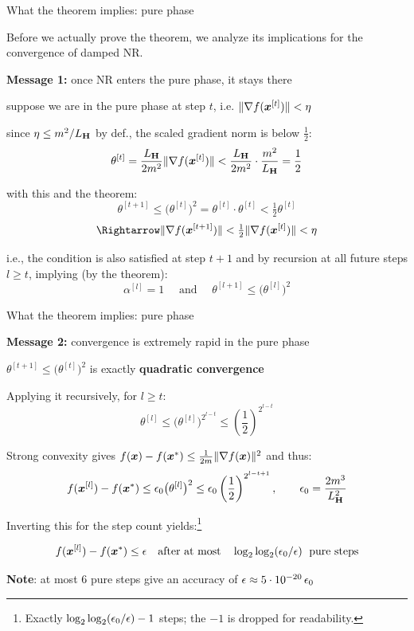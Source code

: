 \documentclass[11pt,compress,t,notes=noshow, xcolor=table]{beamer}
\newcommand{\LH}{L_{\H}}
\begin{document}
\begin{framei}[fs=small]{What the theorem implies: pure phase}
\item [] Before we actually prove the theorem, we analyze its implications for the convergence of damped NR.
\item \textbf{Message 1:} once NR enters the pure phase, it stays there
\begin{itemizeM}
  \item suppose we are in the pure phase at step $t$, i.e. $\|\nabla f(\bm{x}^{[t]})\| < \eta$
  \item since $\eta \le m^2/\LH$ by def., the scaled gradient norm is below $\tfrac{1}{2}$:
  $$\theta^{[t]} = \frac{\LH}{2m^2}\|\nabla f(\xv^{[t]})\|
  < \frac{\LH}{2m^2} \cdot \frac{m^2}{\LH} = \frac{1}{2}$$
  \item with this and the theorem:
  $$\theta^{[t+1]} \le \big( \theta^{[t]} \big)^2 = \theta^{[t]} \cdot \theta^{[t]}
  < \tfrac{1}{2} \theta^{[t]}$$
  $$\Rightarrow \|\nabla f(\xv^{[t+1]})\| < \tfrac{1}{2} \|\nabla f(\xv^{[t]})\| < \eta$$
  \item i.e., the condition is also satisfied at step $t+1$ and by recursion at all future steps $l \geq t$, implying (by the theorem):
  $$\alpha^{[l]} = 1 \quad \text{ and } \quad \theta^{[l+1]} \le \big( \theta^{[l]} \big)^2$$
\end{itemizeM}
\end{framei}

\begin{framei}[fs=small]{What the theorem implies: pure phase}
\item \textbf{Message 2:} convergence is extremely rapid in the pure phase
\begin{itemizeM}
\item $\theta^{[t+1]} \le \big( \theta^{[t]} \big)^2$ is exactly \textbf{quadratic convergence}
\item Applying it recursively, for $l \geq t$:
$$\theta^{[l]} \le \big( \theta^{[t]} \big)^{2^{l-t}} \leq \left(\frac{1}{2}\right)^{2^{l-t}}$$
\item Strong convexity gives $f(\bm{x}) - f(\bm{x}^\ast) \le \frac{1}{2m}\|\nabla f(\bm{x})\|^2$ and thus:
$$f(\xv^{[l]}) - f(\xvs) \le \eps_0 \big( \theta^{[l]} \big)^2
\le \eps_0 \left(\frac{1}{2}\right)^{2^{l-t+1}}, \qquad \eps_0 = \frac{2m^3}{\LH^2}$$
\item Inverting this for the step count yields:\footnote{\footnotesize Exactly
$\log_2 \log_2 (\epsilon_0/\epsilon) - 1$ steps; the $-1$ is dropped for readability.}
\begin{framed}
$$f(\bm{x}^{[l]}) - f(\bm{x}^\ast) \le \epsilon \quad \text{after at most} \quad \log_2 \log_2 (\epsilon_0/\epsilon)
\; \text{ pure steps}$$
\end{framed}
\item[$\Rightarrow$] \textbf{Note}: at most 6 pure steps give an accuracy of
$\epsilon \approx 5 \cdot 10^{-20} \, \epsilon_0$
\end{itemizeM}
\end{framei}
\end{document}
